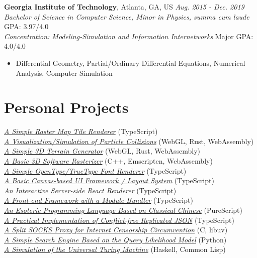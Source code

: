 \documentclass[12pt]{article}
\begin{document}
\textbf{Georgia Institute of Technology}, Atlanta, GA, US \hfill \textit{Aug. 2015 - Dec. 2019}\\
\textit{Bachelor of Science in Computer Science, Minor in Physics, \textit{summa cum laude}} \hfill GPA: 3.97/4.0\\
\textit{Concentration: Modeling-Simulation and Information Internetworks} \hfill Major GPA: 4.0/4.0
\begin{itemize}
\small
\item Differential Geometry, Partial/Ordinary Differential Equations, Numerical Analysis, Computer Simulation
\end{itemize}

\section*{Personal Projects}
\href{https://galmungral.github.io/mercator}{\textit{A Simple Raster Map Tile Renderer}} \hfill (TypeScript) \\
\href{https://galmungral.github.io/particle-simulation}{\textit{A Visualization/Simulation of Particle Collisions}} 
\hfill (WebGL, Rust, WebAssembly) \\
\href{https://galmungral.github.io/terrain-generator}{\textit{A Simple 3D Terrain Generator}} \hfill (WebGL, Rust, WebAssembly) \\
\href{https://galmungral.github.io/rasterizer?file=billboard.txt}{\textit{A Basic 3D Software Rasterizer}} \hfill (C++, Emscripten, WebAssembly) \\
\href{https://galmungral.github.io/text2svg}{\textit{A Simple OpenType/TrueType Font Renderer}} \hfill (TypeScript) \\
\href{https://galmungral.github.io/michelangelo}{\textit{A Basic Canvas-based UI Framework / Layout System}} \hfill (TypeScript) \\
\href{https://github.com/galmungral/react-teletype}{\textit{An Interactive Server-side React Renderer}} \hfill (TypeScript) \\
\href{https://github.com/galmungral/replay}{\textit{A Front-end Framework with a Module Bundler}} \hfill (TypeScript) \\
\href{https://galmungral.github.io/hanbun-lang}{\textit{An Esoteric Programming Language Based on Classical Chinese}} \hfill (PureScript) \\
\href{https://github.com/galmungral/json-crdt}{\textit{A Practical Implementation of Conflict-free Replicated JSON}} \hfill (TypeScript) \\
\href{https://github.com/galmungral/telescope}{\textit{A Split SOCKS Proxy for Internet Censorship Circumvention}} \hfill (C, libuv) \\
\href{https://github.com/galmungral/plato}{\textit{A Simple Search Engine Based on the Query Likelihood Model}} \hfill (Python) \\
\href{https://github.com/galmungral/turing-machine}{\textit{A Simulation of the Universal Turing Machine}} \hfill (Haskell, Common Lisp)
\end{document}

